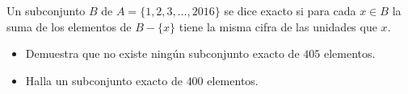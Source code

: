 Un subconjunto $B$ de $A=\{1,2,3,\dots,2016\}$ se dice exacto si para cada $x\in B$ la suma de los elementos de $B-\{x\}$ tiene la misma cifra de las unidades que $x$.
 \begin{itemize} 
 \item Demuestra que no existe ningún subconjunto exacto de $405$ elementos. 
 \item  Halla un subconjunto exacto de $400$ elementos.
 \end{itemize} 